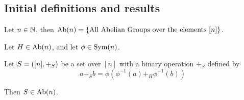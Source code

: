 \subsection{Initial definitions and results}

\begin{definition}
    Let \( n \in \mathbb{N} \), then \( \operatorname{Ab}(n) = \left\{  \text{All Abelian Groups over the elements } [n] \right\} \).
\end{definition}

\begin{theorem} \label{thm:abelian-conjugacy}
    Let \( H \in \operatorname{Ab}(n) \), and let \( \phi \in \operatorname{Sym}(n) \).

    Let \( S = \left( [n], +_S \right) \) be a set over \( [n] \) with a binary operation \( +_S \) defined by
    \begin{equation} \label{eq:abelian-conjugacy}
        a +_S b = \phi(\phi^{-1}(a) +_H \phi^{-1}(b))
    \end{equation}
    
    Then \( S \in \operatorname{Ab}(n) \).
\end{theorem}
